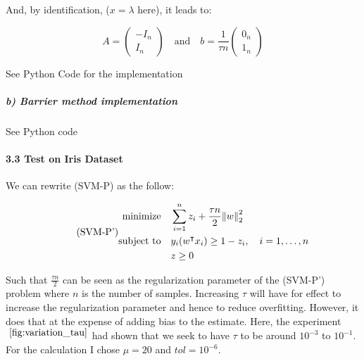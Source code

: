 \documentclass[11pt]{article}
\numberwithin{figure}{section} %
\begin{document}
And, by identification, ($x =\lambda$ here), it leads to:

\begin{framed}
$$
A = \begin{pmatrix} 
- I_{n} \\
I_{n}
\end{pmatrix}\quad\text{and}\quad
b = \frac{1}{\tau n}\begin{pmatrix} 
0_{n} \\
1_{n}
\end{pmatrix}
$$
\end{framed} 

See Python Code for the implementation

\subparagraph{b) Barrier method implementation} See Python code

\paragraph{3.3 Test on Iris Dataset}
We can rewrite (SVM-P) as the follow:

\begin{equation}\tag*{(SVM-P')}
	\begin{split}
	\text{minimize} \quad & \sum\limits_{i=1}^n z_i + \frac{\tau n}{2} \norm{w}^{2}_2 \\
	\text{subject to} \quad & y_i(w^{\intercal} x_i) \geq 1 - z_i, \quad i=1, \hdots, n \\
	& z \geq 0
	\end{split}
\end{equation}

Such that $\frac{\tau n}{2}$ can be seen as the regularization parameter of the (SVM-P') problem where $n$ is the number of samples. Increasing $\tau$ will have for
effect to increase the regularization parameter and hence to reduce overfitting. However, it does that at the expense of adding bias to the estimate. Here, the experiment$^{~\ref{fig:variation_tau}}$ had shown that we seek to have $\tau$ to be around $10^{-3}$ to $10^{-1}$. For the calculation I chose $\mu = 20$ and $tol = 10^{-6}$.
\end{document}
